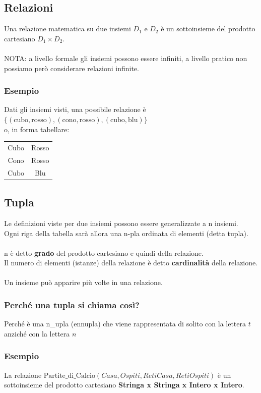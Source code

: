 \documentclass[../main.tex]{subfiles}
\begin{document}
	\subsection{Relazioni}
	Una relazione matematica su due insiemi $D_1$ e $D_2$ è un sottoinsieme del prodotto cartesiano $D_1 \times D_2$.\\ \\
	NOTA: a livello formale gli insiemi possono essere infiniti, a livello pratico non possiamo però considerare relazioni infinite.
	\subsubsection{Esempio}
	Dati gli insiemi visti, una possibile relazione è $\{(\text{cubo}, \text{rosso}), (\text{cono}, \text{rosso}), (\text{cubo}, \text{blu})\}$\\
	o, in forma tabellare:
	\begin{tabular}{ |c|c| }
		\hline
		Cubo & Rosso\\
		Cono & Rosso\\
		Cubo & Blu\\
		\hline
	\end{tabular}
	\subsection{Tupla}
	Le definizioni viste per due insiemi possono essere generalizzate a n insiemi.\\
	Ogni riga della tabella sarà allora una n-pla ordinata di elementi (detta tupla).\\ \\
	n è detto \textbf{grado} del prodotto cartesiano e quindi della relazione.\\
	Il numero di elementi (istanze) della relazione è detto \textbf{cardinalità} della relazione.\\ \\
	Un insieme può apparire più volte in una relazione.
	\subsubsection{Perché una tupla si chiama così?}
	Perché è una n\_upla (ennupla) che viene rappresentata di solito con la lettera $t$ anziché con la lettera $n$ 
	\subsubsection{Esempio}
	La relazione $\text{Partite\_di\_Calcio} (Casa, Ospiti, RetiCasa, RetiOspiti)$ è un sottoinsieme del prodotto cartesiano \textbf{Stringa x Stringa x Intero x Intero}.
\end{document}
